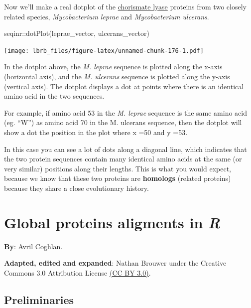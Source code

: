 \documentclass[
]{book}
\newenvironment{Shaded}{\begin{snugshade}}{\end{snugshade}}
\newcommand{\FunctionTok}[1]{\textcolor[rgb]{0.00,0.00,0.00}{#1}}
\newcommand{\NormalTok}[1]{#1}
\newcommand{\SpecialCharTok}[1]{\textcolor[rgb]{0.00,0.00,0.00}{#1}}
\begin{document}
Now we'll make a real dotplot of the \href{https://en.wikipedia.org/wiki/Chorismate_lyase}{chorismate lyase} proteins from two closely related species, \emph{Mycobacterium leprae} and \emph{Mycobacterium ulcerans}.

\begin{Shaded}
\begin{Highlighting}[]
\NormalTok{seqinr}\SpecialCharTok{::}\FunctionTok{dotPlot}\NormalTok{(leprae\_vector, }
\NormalTok{                ulcerans\_vector)}
\end{Highlighting}
\end{Shaded}

\texttt{[image: lbrb\_files/figure-latex/unnamed-chunk-176-1.pdf]}

In the dotplot above, the \emph{M. leprae} sequence is plotted along the x-axis (horizontal axis), and the \emph{M. ulcerans} sequence is plotted along the y-axis (vertical axis). The dotplot displays a dot at points where there is an identical amino acid in the two sequences.

For example, if amino acid 53 in the \emph{M. leprae} sequence is the same amino acid (eg. ``W'') as amino acid 70 in the M. ulcerans sequence, then the dotplot will show a dot the position in the plot where x =50 and y =53.

In this case you can see a lot of dots along a diagonal line, which indicates that the two protein sequences contain many identical amino acids at the same (or very similar) positions along their lengths. This is what you would expect, because we know that these two proteins are \textbf{homologs} (related proteins) because they share a close evolutionary history.

\hypertarget{global-proteins-aligments-in-r}{%
\chapter{\texorpdfstring{Global proteins aligments in \emph{R}}{Global proteins aligments in R}}\label{global-proteins-aligments-in-r}}

\textbf{By}: Avril Coghlan.

\textbf{Adapted, edited and expanded}: Nathan Brouwer under the Creative Commons 3.0 Attribution License \href{https://creativecommons.org/licenses/by/3.0/}{(CC BY 3.0)}.

\hypertarget{preliminaries-6}{%
\section{Preliminaries}\label{preliminaries-6}}
\end{document}
